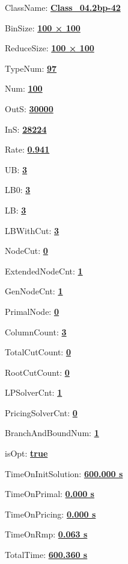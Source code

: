 \documentclass[11pt]{article}
\begin{document}
\pagestyle{empty}


ClassName: \underline{\textbf{Class_04.2bp-42}}
\par
BinSize: \underline{\textbf{100 × 100}}
\par
ReduceSize: \underline{\textbf{100 × 100}}
\par
TypeNum: \underline{\textbf{97}}
\par
Num: \underline{\textbf{100}}
\par
OutS: \underline{\textbf{30000}}
\par
InS: \underline{\textbf{28224}}
\par
Rate: \underline{\textbf{0.941}}
\par
UB: \underline{\textbf{3}}
\par
LB0: \underline{\textbf{3}}
\par
LB: \underline{\textbf{3}}
\par
LBWithCut: \underline{\textbf{3}}
\par
NodeCut: \underline{\textbf{0}}
\par
ExtendedNodeCnt: \underline{\textbf{1}}
\par
GenNodeCnt: \underline{\textbf{1}}
\par
PrimalNode: \underline{\textbf{0}}
\par
ColumnCount: \underline{\textbf{3}}
\par
TotalCutCount: \underline{\textbf{0}}
\par
RootCutCount: \underline{\textbf{0}}
\par
LPSolverCnt: \underline{\textbf{1}}
\par
PricingSolverCnt: \underline{\textbf{0}}
\par
BranchAndBoundNum: \underline{\textbf{1}}
\par
isOpt: \underline{\textbf{true}}
\par
TimeOnInitSolution: \underline{\textbf{600.000 s}}
\par
TimeOnPrimal: \underline{\textbf{0.000 s}}
\par
TimeOnPricing: \underline{\textbf{0.000 s}}
\par
TimeOnRmp: \underline{\textbf{0.063 s}}
\par
TotalTime: \underline{\textbf{600.360 s}}
\par
\newpage
\end{document}
